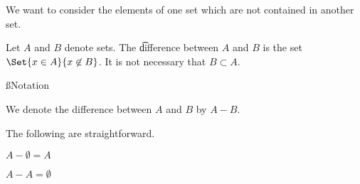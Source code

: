 

We want to consider the elements of one set which are not contained in another set.


Let $A$ and $B$ denote sets.
The \t{difference} between $A$ and $B$ is the set $\Set{x \in A}{x \not\in B}$.
It is not necessary that $B \subset A$.

\ss{Notation}

We denote the difference between $A$ and $B$ by $A - B$.


The following are straightforward.

\begin{proposition}
  $A - \emptyset = A$
\end{proposition}

\begin{proposition}
  $A - A = \emptyset$
\end{proposition}



\blankpage
